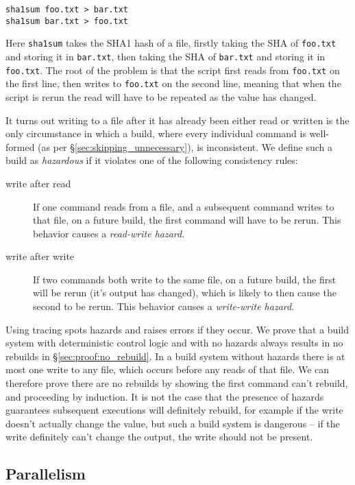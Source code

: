 \begin{verbatim}
sha1sum foo.txt > bar.txt
sha1sum bar.txt > foo.txt
\end{verbatim}

Here \texttt{sha1sum} takes the SHA1 hash of a file, firstly taking the SHA of \texttt{foo.txt} and storing it in \texttt{bar.txt}, then taking the SHA of \texttt{bar.txt} and storing it in \texttt{foo.txt}. The root of the problem is that the script first reads from \texttt{foo.txt} on the first line, then writes to \texttt{foo.txt} on the second line, meaning that when the script is rerun the read will have to be repeated as the value has changed.

It turns out writing to a file after it has already been either read or written is the only circumstance in which a build, where every individual command is well-formed (as per \S\ref{sec:skipping_unnecessary}), is inconsistent. We define such a build as \emph{hazardous} if it violates one of the following consistency rules:

\begin{description}
\item[write after read] If one command reads from a file, and a subsequent command writes to that file, on a future build, the first command will have to be rerun.  This behavior causes a \emph{read-write hazard}.
\item[write after write] If two commands both write to the same file, on a future build, the first will be rerun (it's output has changed), which is likely to then cause the second to be rerun.  This behavior causes a \emph{write-write hazard}.
\end{description}

Using tracing \Rattle spots hazards and raises errors if they occur. We prove that a build system with deterministic control logic and with no hazards always results in no rebuilds in \S\ref{sec:proof:no_rebuild}. In a build system without hazards there is at most one write to any file, which occurs before any reads of that file. We can therefore prove there are no rebuilds by showing the first command can't rebuild, and proceeding by induction. It is not the case that the presence of hazards guarantees subsequent executions will definitely rebuild, for example if the write doesn't actually change the value, but such a build system is dangerous -- if the write definitely can't change the output, the write should not be present.

\subsection{Parallelism}

